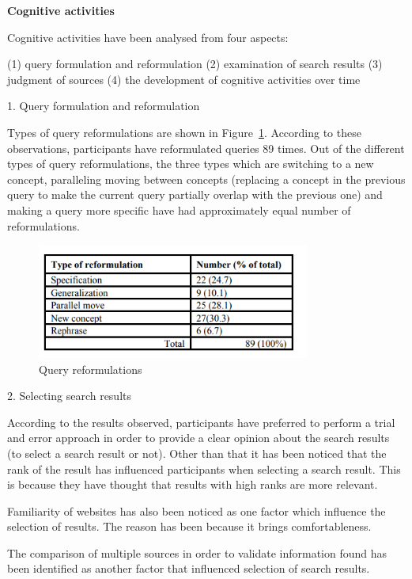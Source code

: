 \documentclass[]{article}
\begin{document}
\textbf{Cognitive activities}

Cognitive activities have been analysed from four aspects:

(1)	query formulation and reformulation
(2)	examination of search results
(3)	judgment of sources
(4)	the development of cognitive activities over time
    
1.	Query formulation and reformulation

Types of query reformulations are shown in Figure~\ref{fig4}. According to these observations, participants have reformulated queries 89 times. Out of the different types of query reformulations, the three types which are switching to a new concept, paralleling moving between concepts (replacing a concept in the previous query to make the current query partially overlap with the previous one) and making a query more specific have had approximately equal number of reformulations. 

\begin{figure}[t!]
	\includegraphics[width=0.8\textwidth]{Capture4.png}
	\caption{ Query reformulations\label{fig4}}
\end{figure}

2. Selecting search results 

According to the results observed, participants have preferred to perform a trial and error approach in order to provide a clear opinion about the search results (to select a search result or not). Other than that it has been noticed that the rank of the result has influenced participants when selecting a search result. This is because they have thought that results with high ranks are more relevant. 
  
Familiarity of websites has also been noticed as one factor which influence the selection of results. The reason has been because it brings comfortableness. 

The comparison of multiple sources in order to validate information found has been identified as another factor that influenced selection of search results.        
\end{document}
